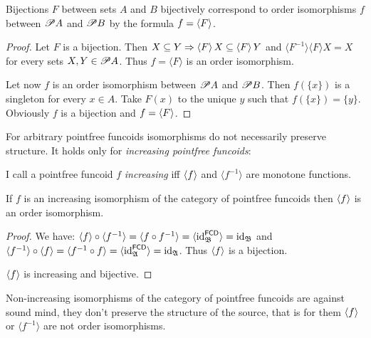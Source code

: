 \begin{prop}
  Bijections $F$ between sets $A$ and $B$ bijectively correspond to order
  isomorphisms $f$ between $\mathscr{P} A$ and $\mathscr{P} B$ by the formula
  $f = \left\langle F\right\rangle$.
\end{prop}

\begin{proof}
  Let $F$ is a bijection. Then $X \subseteq Y \Rightarrow \left\langle F\right\rangle X
  \subseteq \left\langle F\right\rangle Y$ and $\langle F^{- 1} \rangle \langle F
  \rangle X = X$ for every sets $X, Y \in \mathscr{P} A$. Thus $f = \langle F
  \rangle$ is an order isomorphism.
  
  Let now $f$ is an order isomorphism between $\mathscr{P} A$ and $\mathscr{P}
  B$. Then $f (\{ x \})$ is a singleton for every $x \in A$. Take $F (x)$ to
  the unique $y$ such that $f (\{ x \}) = \{ y \}$. Obviously $f$ is a
  bijection and $f = \left\langle F\right\rangle$.
\end{proof}

For arbitrary pointfree funcoids isomorphisms do not necessarily preserve
structure. It holds only for \emph{increasing pointfree funcoids}:

\begin{defn}
  I call a pointfree funcoid $f$ \emph{increasing} iff $\left\langle f\right\rangle$
  and $\langle f^{- 1} \rangle$ are monotone functions.
\end{defn}

\begin{prop}
  If $f$ is an increasing isomorphism of the category of pointfree funcoids
  then $\left\langle f\right\rangle$ is an order isomorphism.
\end{prop}

\begin{proof}
  We have: $\left\langle f\right\rangle \circ \langle f^{- 1} \rangle = \langle f \circ
  f^{- 1} \rangle = \langle \operatorname{id}^{\mathsf{FCD}}_{\mathfrak{B}}
  \rangle = \operatorname{id}_{\mathfrak{B}}$ and $\langle f^{- 1} \rangle \circ
  \left\langle f\right\rangle = \langle f^{- 1} \circ f \rangle = \langle
  \operatorname{id}^{\mathsf{FCD}}_{\mathfrak{A}} \rangle =
  \operatorname{id}_{\mathfrak{A}}$. Thus $\left\langle f\right\rangle$ is a bijection.
  
  $\left\langle f\right\rangle$ is increasing and bijective.
\end{proof}

\begin{rem}
  Non-increasing isomorphisms of the category of pointfree funcoids are
  against sound mind, they don't preserve the structure of the source, that is
  for them $\left\langle f\right\rangle$ or $\langle f^{- 1} \rangle$ are not order
  isomorphisms.
\end{rem}

